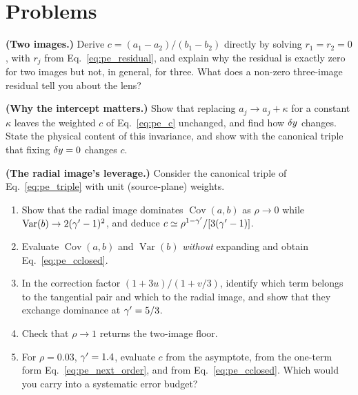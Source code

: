 \section{Problems}
\label{sec:pe_problems}

\begin{exercise}
\label{ex:pe_two_images}
\textbf{(Two images.)}
Derive $c=(a_1-a_2)/(b_1-b_2)$ directly by solving $r_1=r_2=0$, with
$r_j$ from Eq.~\eqref{eq:pe_residual}, and explain why the residual is
exactly zero for two images but not, in general, for three. What does a
non-zero three-image residual tell you about the lens?
\end{exercise}

\begin{exercise}
\label{ex:pe_intercept}
\textbf{(Why the intercept matters.)}
Show that replacing $a_j\to a_j+\kappa$ for a constant $\kappa$ leaves
the weighted $c$ of Eq.~\eqref{eq:pe_c} unchanged, and find how
$\delta y$ changes. State the physical content of this invariance,
and show with the canonical triple that fixing $\delta y=0$ changes
$c$.
\end{exercise}

\begin{exercise}
\label{ex:pe_radial_leverage}
\textbf{(The radial image's leverage.)}
Consider the canonical triple of Eq.~\eqref{eq:pe_triple} with unit
(source-plane) weights.
\begin{enumerate}[label=(\alph*)]
    \item Show that the radial image dominates $\operatorname{Cov}(a,b)$
          as $\rho\to0$ while $\operatorname{Var}(b)\to2(\gamma'-1)^2$, and
          deduce $c\simeq\rho^{1-\gamma'}/[3(\gamma'-1)]$.
    \item Evaluate $\operatorname{Cov}(a,b)$ and $\operatorname{Var}(b)$
          \emph{without} expanding and obtain Eq.~\eqref{eq:pe_cclosed}.
    \item In the correction factor $(1+3u)/(1+v/3)$, identify which term
          belongs to the tangential pair and which to the radial image,
          and show that they exchange dominance at $\gamma'=5/3$.
    \item Check that $\rho\to1$ returns the two-image floor.
    \item For $\rho=0.03$, $\gamma'=1.4$, evaluate $c$ from the asymptote,
          from the one-term form Eq.~\eqref{eq:pe_next_order}, and from
          Eq.~\eqref{eq:pe_cclosed}. Which would you carry into a
          systematic error budget?
\end{enumerate}
\end{exercise}


